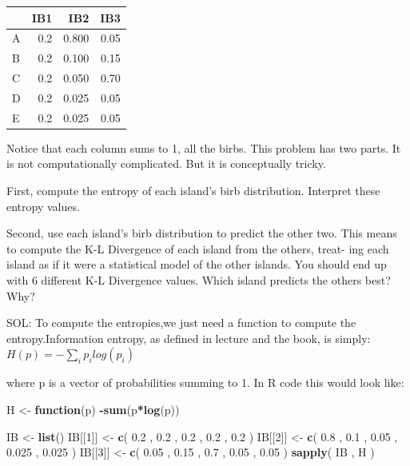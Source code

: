 \documentclass[
]{article}
\newenvironment{Shaded}{\begin{snugshade}}{\end{snugshade}}
\newcommand{\ControlFlowTok}[1]{\textcolor[rgb]{0.13,0.29,0.53}{\textbf{#1}}}
\newcommand{\DecValTok}[1]{\textcolor[rgb]{0.00,0.00,0.81}{#1}}
\newcommand{\FloatTok}[1]{\textcolor[rgb]{0.00,0.00,0.81}{#1}}
\newcommand{\KeywordTok}[1]{\textcolor[rgb]{0.13,0.29,0.53}{\textbf{#1}}}
\newcommand{\NormalTok}[1]{#1}
\newcommand{\OperatorTok}[1]{\textcolor[rgb]{0.81,0.36,0.00}{\textbf{#1}}}
\newcommand{\StringTok}[1]{\textcolor[rgb]{0.31,0.60,0.02}{#1}}
\begin{document}
\begin{longtable}[]{@{}lrrr@{}}
\toprule
& IB1 & IB2 & IB3\tabularnewline
\midrule
\endhead
A & 0.2 & 0.800 & 0.05\tabularnewline
B & 0.2 & 0.100 & 0.15\tabularnewline
C & 0.2 & 0.050 & 0.70\tabularnewline
D & 0.2 & 0.025 & 0.05\tabularnewline
E & 0.2 & 0.025 & 0.05\tabularnewline
\bottomrule
\end{longtable}

Notice that each column sums to 1, all the birbs. This problem has two
parts. It is not computationally complicated. But it is conceptually
tricky.

First, compute the entropy of each island's birb distribution. Interpret
these entropy values.

Second, use each island's birb distribution to predict the other two.
This means to compute the K-L Divergence of each island from the others,
treat- ing each island as if it were a statistical model of the other
islands. You should end up with 6 different K-L Divergence values. Which
island predicts the others best? Why?

SOL: To compute the entropies,we just need a function to compute the
entropy.Information entropy, as defined in lecture and the book, is
simply: \(H(p) = - \sum_{i}p_i log(p_i)\)

where p is a vector of probabilities summing to 1. In R code this would
look like:

\begin{Shaded}
\begin{Highlighting}[]
\NormalTok{H <-}\StringTok{ }\ControlFlowTok{function}\NormalTok{(p) }\OperatorTok{-}\KeywordTok{sum}\NormalTok{(p}\OperatorTok{*}\KeywordTok{log}\NormalTok{(p))}

\NormalTok{IB <-}\StringTok{ }\KeywordTok{list}\NormalTok{()}
\NormalTok{IB[[}\DecValTok{1}\NormalTok{]] <-}\StringTok{ }\KeywordTok{c}\NormalTok{( }\FloatTok{0.2}\NormalTok{ , }\FloatTok{0.2}\NormalTok{ , }\FloatTok{0.2}\NormalTok{ , }\FloatTok{0.2}\NormalTok{ , }\FloatTok{0.2}\NormalTok{ )}
\NormalTok{IB[[}\DecValTok{2}\NormalTok{]] <-}\StringTok{ }\KeywordTok{c}\NormalTok{( }\FloatTok{0.8}\NormalTok{ , }\FloatTok{0.1}\NormalTok{ , }\FloatTok{0.05}\NormalTok{ , }\FloatTok{0.025}\NormalTok{ , }\FloatTok{0.025}\NormalTok{ )}
\NormalTok{IB[[}\DecValTok{3}\NormalTok{]] <-}\StringTok{ }\KeywordTok{c}\NormalTok{( }\FloatTok{0.05}\NormalTok{ , }\FloatTok{0.15}\NormalTok{ , }\FloatTok{0.7}\NormalTok{ , }\FloatTok{0.05}\NormalTok{ , }\FloatTok{0.05}\NormalTok{ )}
\KeywordTok{sapply}\NormalTok{( IB , H )}
\end{Highlighting}
\end{Shaded}
\end{document}
